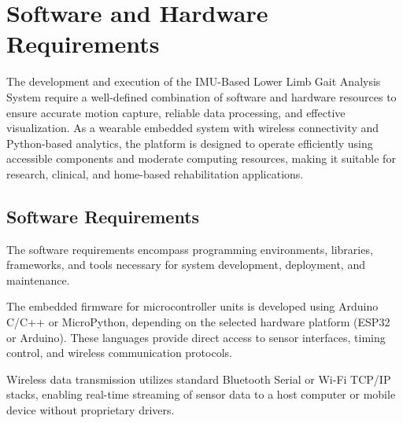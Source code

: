 \documentclass[12pt,a4paper]{report}
\begin{document}
\setcounter{chapter}{3}
\clearpage
\thispagestyle{empty}

\noindent
{}

\clearpage
{}
\setcounter{section}{0}
\section{Software and Hardware Requirements}

The development and execution of the IMU-Based Lower Limb Gait Analysis System require a well-defined combination of software and hardware resources to ensure accurate motion capture, reliable data processing, and effective visualization. As a wearable embedded system with wireless connectivity and Python-based analytics, the platform is designed to operate efficiently using accessible components and moderate computing resources, making it suitable for research, clinical, and home-based rehabilitation applications.

\subsection{Software Requirements}

The software requirements encompass programming environments, libraries, frameworks, and tools necessary for system development, deployment, and maintenance.

The embedded firmware for microcontroller units is developed using Arduino C/C++ or MicroPython, depending on the selected hardware platform (ESP32 or Arduino). These languages provide direct access to sensor interfaces, timing control, and wireless communication protocols.

Wireless data transmission utilizes standard Bluetooth Serial or Wi-Fi TCP/IP stacks, enabling real-time streaming of sensor data to a host computer or mobile device without proprietary drivers.
\end{document}
